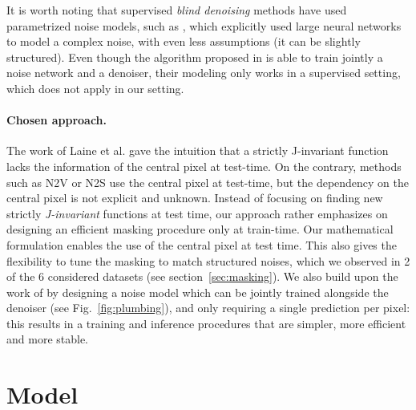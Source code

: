 \documentclass{article}
\begin{document}
It is worth noting that supervised \textit{blind denoising} methods have used parametrized noise models, such as \cite{zhang2017beyond,yue2019variational}, which explicitly used large neural networks to model a complex noise, with even less assumptions (it can be slightly structured). Even though the algorithm proposed in \cite{yue2019variational} is able to train jointly a noise network and a denoiser, their modeling only works in a supervised setting, which does not apply in our setting.

\paragraph{Chosen approach.} The work of Laine et al. \cite{laine2019high} gave the intuition that a strictly J-invariant function lacks the information of the central pixel at test-time. On the contrary, methods such as N2V or N2S use the central pixel at test-time, but the dependency on the central pixel is not explicit and unknown. Instead of focusing on finding new strictly \textit{J-invariant} functions at test time, our approach rather emphasizes on designing an efficient masking procedure only at train-time. Our mathematical formulation enables the use of the central pixel at test time.
This also gives the flexibility to tune the masking to match structured noises, which we observed in 2 of the 6 considered datasets (see section~\ref{sec:masking}).
We also build upon the work of \cite{laine2019high, krull2019probabilistic} by designing a noise model which can be jointly trained alongside the denoiser (see Fig.~\ref{fig:plumbing}), and only requiring a single prediction per pixel: this results in a training and inference procedures that are simpler, more efficient and more stable.

\section{Model}
\label{sec:model}
\end{document}
